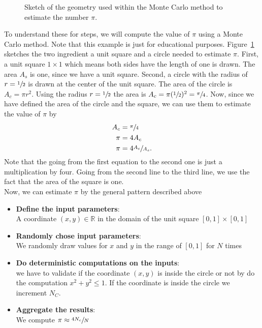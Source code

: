 \documentclass[11pt,fleqn]{book} %
\begin{document}
\begin{figure}[h]
  \begin{center}
  \end{center}
  \caption{Sketch of the geometry used within the Monte Carlo method to estimate the number $\pi$.}
  \label{fig:monte}
\end{figure}
To understand these for steps, we will compute the value of $\pi$ using a Monte Carlo method. Note that this example is just for educational purposes. Figure~\ref{fig:monte} sketches the two ingredient a unit square and a circle needed to estimate $\pi$. First, a unit square $1 \times 1$ which means both sides have the length of one is drawn. The area $A_s$ is one, since we have a unit square. Second, a circle with the radius of $r=\sfrac{1}{2}$ is drawn at the center of the unit square. The area of the circle is $A_c=\pi r^2$. Using the radius $r=\sfrac{1}{2}$ the area is $A_c=\pi(\sfrac{1}{2})^2=\sfrac{\pi}{4}$. Now, since we have defined the area of the circle and the square, we can use them to estimate the value of $\pi$ by
\begin{align}
A_c &= \sfrac{\pi}{4} \notag\\
\pi &= 4 A_c \notag\\
\pi &= 4 \sfrac{A_c}{A_s}\text{.}
\end{align}
Note that the going from the first equation to the second one is just a multiplication by four. Going from the second line to the third line, we use the fact that the area of the square is one. \\

Now, we can estimate $\pi$ by the general pattern described above
\begin{itemize}
\item \textbf{Define the input parameters}: \\ A coordinate  $(x,y)\in\mathbb{R}$ in the domain of the unit square $[0,1]\times [0,1]$
\item\textbf{ Randomly chose input parameters}:\\ We randomly draw values for $x$ and $y$ in the range of $[0,1]$ for $N$ times
\item \textbf{Do deterministic computations on the inputs}:  \\
we have to validate if the coordinate $(x,y)$ is inside the circle or not by do the computation $x^2+y^2\leq 1$. If the coordinate is inside the circle we increment $N_C$.
\item \textbf{Aggregate the results}: \\
We compute $\pi\approx \sfrac{4N_c}{N}$
\end{itemize}
\vspace{0.25cm}
\end{document}
